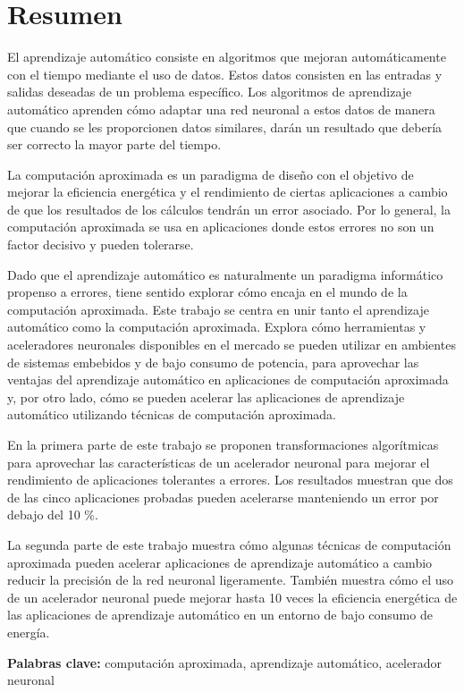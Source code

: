\chapter*{Resumen}
\thispagestyle{empty}

El aprendizaje automático consiste en algoritmos que mejoran automáticamente con el tiempo mediante el uso de datos. Estos datos consisten en las entradas y salidas deseadas de un problema específico. Los algoritmos de aprendizaje automático aprenden cómo adaptar una red neuronal a estos datos de manera que cuando se les proporcionen datos similares, darán un resultado que debería ser correcto la mayor parte del tiempo.

La computación aproximada es un paradigma de diseño con el objetivo de mejorar la eficiencia energética y el rendimiento de ciertas aplicaciones a cambio de que los resultados de los cálculos tendrán un error asociado. Por lo general, la computación aproximada se usa en aplicaciones donde estos errores no son un factor decisivo y pueden tolerarse.

Dado que el aprendizaje automático es naturalmente un paradigma informático propenso a errores, tiene sentido explorar cómo encaja en el mundo de la computación aproximada. Este trabajo se centra en unir tanto el aprendizaje automático como la computación aproximada. Explora cómo herramientas y aceleradores neuronales disponibles en el mercado se pueden utilizar en ambientes de sistemas embebidos y de bajo consumo de potencia, para aprovechar las ventajas del aprendizaje automático en aplicaciones de computación aproximada y, por otro lado, cómo se pueden acelerar las aplicaciones de aprendizaje automático utilizando técnicas de computación aproximada.

En la primera parte de este trabajo se proponen transformaciones algorítmicas para aprovechar las características de un acelerador neuronal para mejorar el rendimiento de aplicaciones tolerantes a errores. Los resultados muestran que dos de las cinco aplicaciones probadas pueden acelerarse manteniendo un error por debajo del 10 \%.

La segunda parte de este trabajo muestra cómo algunas técnicas de computación aproximada pueden acelerar aplicaciones de aprendizaje automático a cambio reducir la precisión de la red neuronal ligeramente. También muestra cómo el uso de un acelerador neuronal puede mejorar hasta 10 veces la eficiencia energética de las aplicaciones de aprendizaje automático en un entorno de bajo consumo de energía.

\bigskip


\textbf{Palabras clave:} computación aproximada, aprendizaje automático, acelerador neuronal

\cleardoublepage

